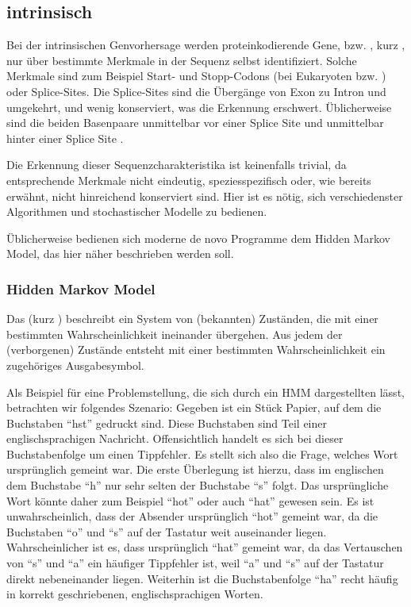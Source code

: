 \subsection{intrinsisch}
Bei der intrinsischen Genvorhersage werden proteinkodierende Gene, bzw.
, kurz , nur über bestimmte Merkmale in
der Sequenz selbst identifiziert.
Solche Merkmale sind zum Beispiel Start- und Stopp-Codons (bei
Eukaryoten  bzw. ) oder Splice-Sites.
Die Splice-Sites sind die Übergänge von Exon zu Intron und umgekehrt, und wenig
konserviert, was die Erkennung erschwert.
Üblicherweise sind die beiden Basenpaare unmittelbar vor einer
Splice Site  und unmittelbar hinter einer Splice Site .

Die Erkennung dieser Sequenzcharakteristika ist keinenfalls trivial, da entsprechende
Merkmale nicht eindeutig, speziesspezifisch oder, wie bereits erwähnt, nicht
hinreichend konserviert sind.
Hier ist es nötig, sich verschiedenster Algorithmen und stochastischer
Modelle zu bedienen.

Üblicherweise bedienen sich moderne de novo  Programme dem Hidden
Markov Model, das hier näher beschrieben werden soll.

\subsubsection{Hidden Markov Model}
Das  (kurz )
beschreibt ein System von (bekannten) Zuständen, die mit einer bestimmten
Wahrscheinlichkeit ineinander übergehen.
Aus jedem der (verborgenen) Zustände entsteht mit einer
bestimmten Wahrscheinlichkeit ein zugehöriges Ausgabesymbol.

Als Beispiel für eine Problemstellung, die sich durch ein HMM dargestellten
lässt, betrachten wir folgendes Szenario:
Gegeben ist ein Stück Papier, auf dem die Buchstaben \enquote{hst}
gedruckt sind.
Diese Buchstaben sind Teil einer englischsprachigen Nachricht.
Offensichtlich handelt es sich bei dieser Buchstabenfolge um einen Tippfehler.
Es stellt sich also die Frage, welches Wort ursprünglich gemeint war.
Die erste Überlegung ist hierzu, dass im englischen dem Buchstabe \enquote{h}
nur sehr selten der Buchstabe \enquote{s} folgt.
Das ursprüngliche Wort könnte daher zum Beispiel \enquote{hot} oder auch
\enquote{hat} gewesen sein.
Es ist unwahrscheinlich, dass der Absender ursprünglich \enquote{hot} gemeint
war, da die Buchstaben \enquote{o} und \enquote{s} auf der Tastatur weit
auseinander liegen.
Wahrscheinlicher ist es, dass ursprünglich \enquote{hat} gemeint war, da das
Vertauschen von \enquote{s} und \enquote{a} ein häufiger Tippfehler ist, weil
\enquote{a} und \enquote{s} auf der Tastatur direkt nebeneinander liegen.
Weiterhin ist die Buchstabenfolge \enquote{ha} recht häufig in korrekt
geschriebenen, englischsprachigen Worten.

